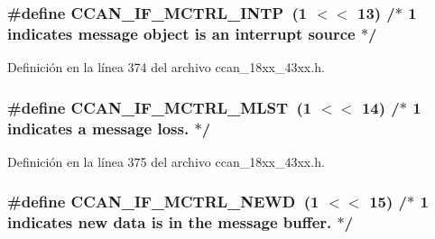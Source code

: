 \subsubsection[{\texorpdfstring{C\+C\+A\+N\+\_\+\+I\+F\+\_\+\+M\+C\+T\+R\+L\+\_\+\+I\+N\+TP}{CCAN_IF_MCTRL_INTP}}]{\setlength{\rightskip}{0pt plus 5cm}\#define C\+C\+A\+N\+\_\+\+I\+F\+\_\+\+M\+C\+T\+R\+L\+\_\+\+I\+N\+TP~(1 $<$$<$ 13)		/$\ast$ 1 indicates message object is an interrupt source $\ast$/}\hypertarget{group___c_c_a_n__18_x_x__43_x_x_ga1e55aa393304c0d4f1bca6099f086479}{}\label{group___c_c_a_n__18_x_x__43_x_x_ga1e55aa393304c0d4f1bca6099f086479}


Definición en la línea 374 del archivo ccan\+\_\+18xx\+\_\+43xx.\+h.

\subsubsection[{\texorpdfstring{C\+C\+A\+N\+\_\+\+I\+F\+\_\+\+M\+C\+T\+R\+L\+\_\+\+M\+L\+ST}{CCAN_IF_MCTRL_MLST}}]{\setlength{\rightskip}{0pt plus 5cm}\#define C\+C\+A\+N\+\_\+\+I\+F\+\_\+\+M\+C\+T\+R\+L\+\_\+\+M\+L\+ST~(1 $<$$<$ 14)		/$\ast$ 1 indicates a message loss. $\ast$/}\hypertarget{group___c_c_a_n__18_x_x__43_x_x_ga1505ed25fd25085b10a3812ad54bc7d5}{}\label{group___c_c_a_n__18_x_x__43_x_x_ga1505ed25fd25085b10a3812ad54bc7d5}


Definición en la línea 375 del archivo ccan\+\_\+18xx\+\_\+43xx.\+h.

\subsubsection[{\texorpdfstring{C\+C\+A\+N\+\_\+\+I\+F\+\_\+\+M\+C\+T\+R\+L\+\_\+\+N\+E\+WD}{CCAN_IF_MCTRL_NEWD}}]{\setlength{\rightskip}{0pt plus 5cm}\#define C\+C\+A\+N\+\_\+\+I\+F\+\_\+\+M\+C\+T\+R\+L\+\_\+\+N\+E\+WD~(1 $<$$<$ 15)		/$\ast$ 1 indicates new data is in the message buffer.  $\ast$/}\hypertarget{group___c_c_a_n__18_x_x__43_x_x_ga056b3ce9b31967dfc3ff0e0ed9d08b1d}{}\label{group___c_c_a_n__18_x_x__43_x_x_ga056b3ce9b31967dfc3ff0e0ed9d08b1d}


